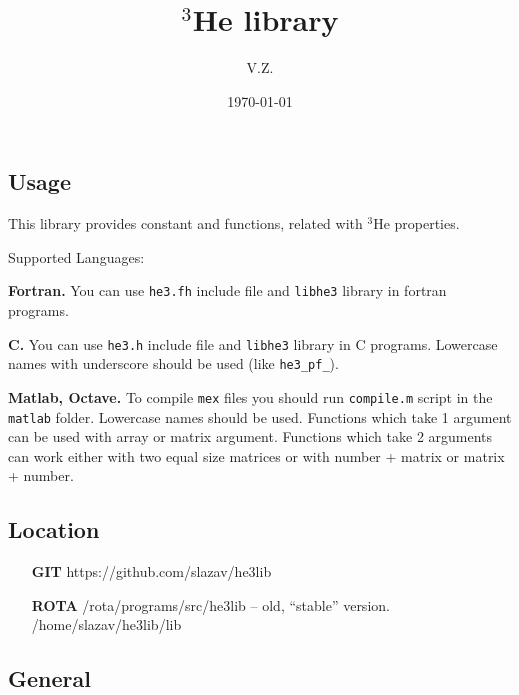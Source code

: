 \documentclass[a4paper]{article}
\begin{document}
\title{$^3$He library}
\date{\today}
\author{V.Z.}
\maketitle

\subsection*{Usage}

This library provides constant and functions, related with $^3$He properties.

\noindent Supported Languages:

{\bf Fortran.}
You can use {\tt he3.fh} include file and {\tt libhe3} library in
fortran programs.

{\bf C.}
You can use {\tt he3.h} include file and {\tt libhe3} library in C programs.
Lowercase names with underscore should be used (like {\tt he3\_pf\_}).

{\bf Matlab, Octave.}
To compile {\tt mex} files you should run {\tt compile.m} script in the {\tt matlab}
folder. Lowercase names should be used.
Functions which take 1 argument can be used with array or matrix argument.
Functions which take 2 arguments can work either with two equal size matrices
or with number + matrix or matrix + number.

\subsection*{Location}
\begin{itemize}
\item[\bf GIT]  https://github.com/slazav/he3lib
\item[\bf ROTA] /rota/programs/src/he3lib -- old, ``stable'' version.\\
/home/slazav/he3lib/lib
\end{itemize}

\subsection*{General}
\end{document}
